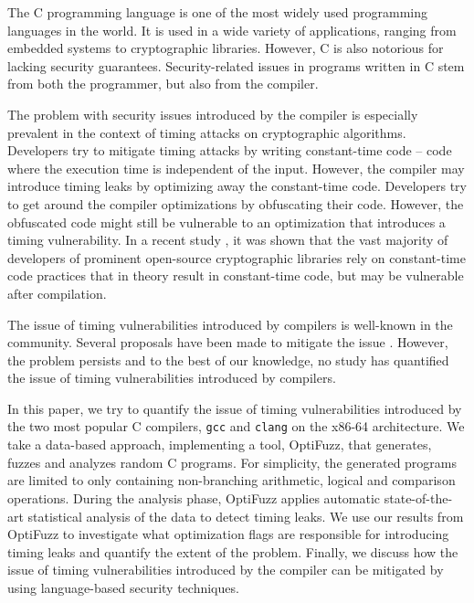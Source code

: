 The C programming language is one of the most widely used programming languages in the world. 
It is used in a wide variety of applications, ranging from embedded systems to cryptographic libraries. 
However, C is also notorious for lacking security guarantees.
Security-related issues in programs written in C stem from both the programmer, but also from the compiler.

The problem with security issues introduced by the compiler is especially prevalent in the context of timing attacks on cryptographic algorithms. 
Developers try to mitigate timing attacks by writing constant-time code -- code where the execution time is independent of the input.
However, the compiler may introduce timing leaks by optimizing away the constant-time code.
Developers try to get around the compiler optimizations by obfuscating their code. 
However, the obfuscated code might still be vulnerable to an optimization that introduces a timing vulnerability.
In a recent study \citep{developer-survey-timing-attacks}, it was shown that the vast majority of developers of prominent open-source cryptographic libraries rely on constant-time code practices that in theory result in constant-time code, but may be vulnerable after compilation.

The issue of timing vulnerabilities introduced by compilers is well-known in the community.
Several proposals have been made to mitigate the issue \citep{dudect, fact,what-you-c, verified-constant-time-c-comiler}.
However, the problem persists and to the best of our knowledge, no study has quantified the issue of timing vulnerabilities introduced by compilers.

In this paper, we try to quantify the issue of timing vulnerabilities introduced by the two most popular C compilers, \texttt{gcc} and \texttt{clang} on the x86-64 architecture.
We take a data-based approach, implementing a tool, OptiFuzz, that generates, fuzzes and analyzes random C programs.
For simplicity, the generated programs are limited to only containing non-branching arithmetic, logical and comparison operations.
During the analysis phase, OptiFuzz applies automatic state-of-the-art statistical analysis of the data to detect timing leaks.
We use our results from OptiFuzz to investigate what optimization flags are responsible for introducing timing leaks and quantify the extent of the problem.
Finally, we discuss how the issue of timing vulnerabilities introduced by the compiler can be mitigated by using language-based security techniques.

